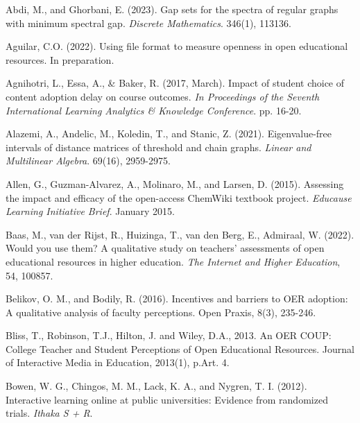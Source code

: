 \documentclass[11pt]{article}
\newcommand{\alink}[2]{\href{#1}{\textcolor{blue}{#2}}}
\begin{document}
\newpage

\begin{thebibliography}{99}

   Abdi, M., and Ghorbani, E. (2023). Gap sets for the spectra of regular graphs with minimum spectral gap. {\em Discrete Mathematics}. 346(1), 113136.

   Aguilar, C.O. (2022). Using file format to measure openness in open educational resources. In preparation.

   Agnihotri, L., Essa, A., \& Baker, R. (2017, March). Impact of student choice of content adoption delay on course outcomes. {\em In Proceedings of the Seventh International Learning Analytics \& Knowledge Conference}. pp. 16-20.

   Alazemi, A., Andelic, M., Koledin, T., and Stanic, Z. (2021). Eigenvalue-free intervals of distance matrices of threshold and chain graphs. {\em Linear and Multilinear Algebra}. 69(16), 2959-2975.

   Allen, G., Guzman-Alvarez, A., Molinaro, M., and Larsen, D. (2015). Assessing the impact and efficacy of the open-access ChemWiki textbook project. {\em Educause Learning Initiative Brief}. January 2015.

   Baas, M., van der Rijst, R., Huizinga, T., van den Berg, E., Admiraal, W. (2022). Would you use them? A qualitative study on teachers' assessments of open educational resources in higher education. {\em The Internet and Higher Education}, 54, 100857.

   Belikov, O. M., and Bodily, R. (2016). Incentives and barriers to OER adoption: A qualitative analysis of faculty perceptions. Open Praxis, 8(3), 235-246. %
  
   Bliss, T., Robinson, T.J., Hilton, J. and Wiley, D.A., 2013. An OER COUP: College Teacher and Student Perceptions of Open Educational Resources. Journal of Interactive Media in Education, 2013(1), p.Art. 4.%

   Bowen, W. G., Chingos, M. M., Lack, K. A., and Nygren, T. I. (2012). Interactive learning online at public universities: Evidence from randomized trials. {\em Ithaka S + R}.


\end{thebibliography}
\end{document}
